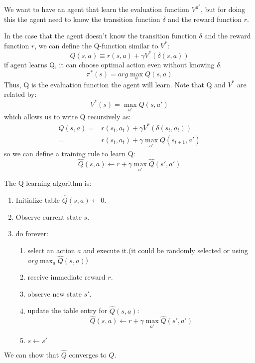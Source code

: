 \documentclass[12pt]{article}
\begin{document}
\begin{enumerate}[label=\textbf{RL.\arabic*}]
    We want to have an agent that learn the evaluation function $V^{\pi^*}$, 
    but for doing this the agent need to know the transition function $\delta$ and the reward function $r$.

    In the case that the agent doesn't know the transition function $\delta$ and the reward function $r$, we can define the Q-function similar to $V^*$:
    \begin{equation}
        Q(s,a) \equiv r(s,a) + \gamma V^*(\delta(s,a))
    \end{equation}
    if agent learns Q, it can choose optimal action even without knowing $\delta$.
    \begin{equation}
        \pi^*(s) = arg\max_{a}Q(s,a)
    \end{equation}
    Thus, Q is the evaluation function the agent will learn.
    Note that Q and $V^*$ are related by:
    \begin{equation}
        V^*(s) = \max_{a'}Q(s,a')
    \end{equation}
    which allows us to write Q recursively as:
    \begin{equation}
        \begin{split}
            Q(s,a) = & r(s_t,a_t) + \gamma V^*(\delta(s_t,a_t)) \\
            = & r(s_t,a_t) + \gamma\max_{a'}Q(s_{t+1},a')
        \end{split}
    \end{equation}
    so we can define a training rule to learn Q:
    \begin{equation}
        \hat{Q}(s,a) \leftarrow r+\gamma\max_{a'}\hat{Q}(s',a')
    \end{equation}

    The Q-learning algorithm is:
    \begin{enumerate}
        \item Initialize table $\hat{Q}(s,a)\leftarrow 0$.
        \item Observe current state $s$.
        \item do forever:
        \begin{enumerate}
            \item select an action $a$ and execute it.(it could be randomly selected or using $arg\max_a\hat{Q}(s,a)$)
            \item receive immediate reward $r$.
            \item observe new state $s'$.
            \item update the table entry for $\hat{Q}(s,a)$:
            \begin{equation}
                \hat{Q}(s,a) \leftarrow r+\gamma\max_{a'}\hat{Q}(s',a')
            \end{equation}
            \item $s\leftarrow s'$
        \end{enumerate}
    \end{enumerate}
    We can show that $\hat{Q}$ converges to $Q$.


\end{enumerate}
\end{document}
